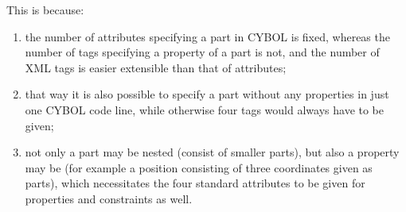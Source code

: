 This is because:

\begin{enumerate}
    \item the number of attributes specifying a part in CYBOL is fixed, whereas
        the number of tags specifying a property of a part is not, and the
        number of XML tags is easier extensible than that of attributes;
    \item that way it is also possible to specify a part without any properties
        in just one CYBOL code line, while otherwise four tags would always
        have to be given;
    \item not only a part may be nested (consist of smaller parts), but also a
        property may be (for example a position consisting of three coordinates
        given as parts), which necessitates the four standard attributes to be
        given for properties and constraints as well.
\end{enumerate}

